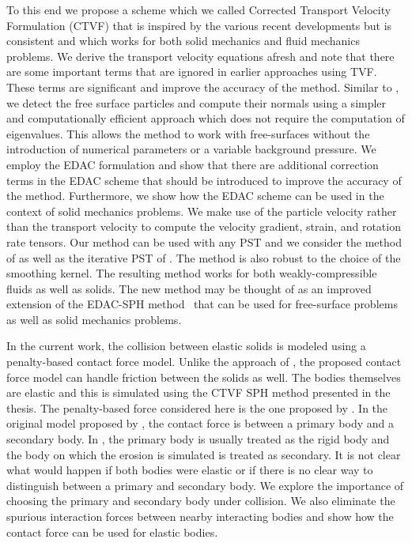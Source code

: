 To this end we propose a scheme which we called Corrected Transport Velocity
Formulation (CTVF) that is inspired by the various recent developments but is
consistent and which works for both solid mechanics and fluid mechanics
problems. We derive the transport velocity equations afresh and note that there
are some important terms that are ignored in earlier approaches using TVF. These
terms are significant and improve the accuracy of the method. Similar to
\cite{oger_ale_sph_2016,sun_consistent_2019}, we detect the free surface
particles and compute their normals using a simpler and computationally
efficient approach which does not require the computation of eigenvalues. This
allows the method to work with free-surfaces without the introduction of
numerical parameters or a variable background pressure. We employ the EDAC
formulation and show that there are additional correction terms in the EDAC
scheme that should be introduced to improve the accuracy of the method.
Furthermore, we show how the EDAC scheme can be used in the context of solid
mechanics problems. We make use of the particle velocity rather than the
transport velocity to compute the velocity gradient, strain, and rotation rate
tensors. Our method can be used with any PST and we consider the method of
\citet{sun_consistent_2019} as well as the iterative PST of
\citet{huang_kernel_2019}. The method is also robust to the choice of the
smoothing kernel. The resulting method works for both weakly-compressible fluids
as well as solids. The new method may be thought of as an improved extension of
the EDAC-SPH method~\citep{edac-sph:cf:2019} that can be used for free-surface
problems as well as solid mechanics problems.


In the current work, the collision between elastic solids is modeled using a
penalty-based contact force model. Unlike the approach of
\cite{yan2021simulation}, the proposed contact force model can handle friction
between the solids as well. The bodies themselves are elastic and this is
simulated using the CTVF SPH method \cite{adepu2021corrected} presented in the
thesis. The penalty-based force considered here is the one proposed by
\citet{mohseni2021particle}. In the original model proposed by
\cite{mohseni2021particle}, the contact force is between a primary body and a
secondary body. In \cite{mohseni2021particle}, the primary body is usually
treated as the rigid body and the body on which the erosion is simulated is
treated as secondary. It is not clear what would happen if both bodies were
elastic or if there is no clear way to distinguish between a primary and
secondary body. We explore the importance of choosing the primary and secondary
body under collision. We also eliminate the spurious interaction forces between
nearby interacting bodies and show how the contact force can be used for elastic
bodies.


